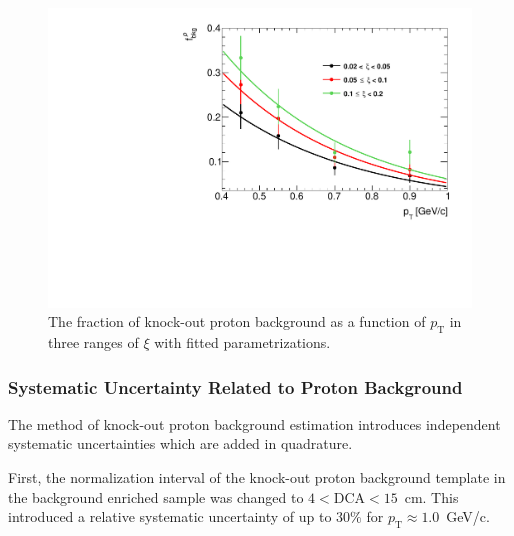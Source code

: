  \begin{figure}[htpb]%
 	\centering
 	\includegraphics[width=0.8\linewidth, page=1]{chapters/chrgSTAR/img/DCAproton/bkg_p.pdf}
 	\caption{The fraction of knock-out proton background  as a function of $p_\textrm{T}$ in three ranges of $\xi$  with  fitted parametrizations.}
 	\label{fig:bkg_proton_fit}
 \end{figure}
 
 \subsubsection{Systematic Uncertainty Related to Proton Background} 
The method of   knock-out proton background estimation  introduces independent systematic uncertainties which are added in quadrature. 

First, the normalization interval of the  knock-out   proton  background template in the background enriched sample was changed to $4<\textrm{DCA}<15$~cm. This introduced a relative systematic uncertainty of up to $30\%$ for $p_\textrm{T}\approx 1.0$~GeV/c. 

